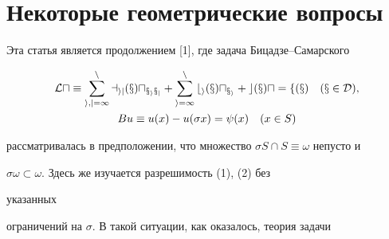  


\date{} 




\pagestyle{plain} %


 




\maketitle 


\label{begin} 


 


\addtocounter{section}{2} 


\addtocounter{thm}{2} 


\addtocounter{note}{2} 


\addtocounter{prop}{2} 


 


 


\section{Некоторые геометрические вопросы} 


 


Эта статья является продолжением [1], где задача Бицадзе--Самарского 


\begin{gather} 


\cal L u\equiv\sum^n_{i,j=1}a_{i j}(x)u_{x_i x_j} 


+\sum^n_{i=1}b_i(x)u_{x_i}+c(x)u=f(x)\quad (x\in D),\\ 


B u\equiv u(x)-u(\sigma x)=\psi(x)\quad (x\in S) 


\end{gather} 


рассматривалась в предположении, что множество $\sigma S\cap 


S\equiv\omega$ непусто и 


$\sigma\omega\subset\omega$. Здесь же изучается разрешимость (1), (2) без 


указанных 


ограничений на $\sigma$. В такой ситуации, как оказалось, теория задачи 


